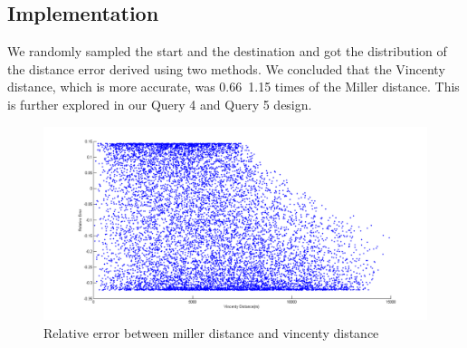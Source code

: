\documentclass[final,1p,times]{elsarticle}
\begin{document}
\subsection{Implementation}
We randomly sampled the start and the destination and got the distribution of the distance error derived using two methods. We concluded that the Vincenty distance, which is more accurate, was 0.66~1.15 times of the Miller distance. This is further explored in our Query 4 and Query 5 design.

\begin{figure}[thpb]
      \centering
      \includegraphics[width=14cm]{Vincenty.png}
      \caption{Relative error between miller distance and vincenty distance}
      \label{fig:Vincenty}
\end{figure}
\end{document}
